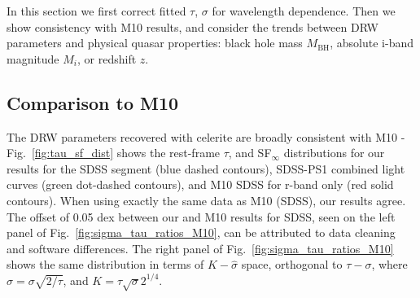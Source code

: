 \documentclass[twocolumn]{aastex62}
\newcommand{\project}[1]{\textsf{#1}}
\begin{document}
In this section we first correct fitted $\tau$, $\sigma$ for wavelength dependence. Then we show consistency with M10 results,  and consider the trends between DRW parameters and physical quasar properties: black hole mass $M_{\mathrm{BH}}$, absolute i-band  magnitude $M_{i}$, or redshift $z$.  


\subsection{Comparison to M10}
The DRW parameters recovered with \project{celerite} are  broadly consistent with M10 - Fig.~\ref{fig:tau_sf_dist} shows the rest-frame  $\tau$, and SF$_{\infty}$ distributions for our results for the SDSS segment (blue dashed contours),  SDSS-PS1 combined light curves (green dot-dashed contours), and  M10 SDSS for r-band only (red solid contours). When using exactly the same data as M10 (SDSS), our results agree. The offset of 0.05 dex  between our and M10 results for SDSS, seen on the left panel of Fig.~\ref{fig:sigma_tau_ratios_M10}, can be attributed to data cleaning and software differences. The right panel of Fig.~\ref{fig:sigma_tau_ratios_M10} shows the same distribution in terms of $K-\hat{\sigma}$ space, orthogonal to $\tau-\sigma$, where $\hat{\sigma} = \sigma\sqrt{2 / \tau}$, and $K = \tau \sqrt{\sigma} 2^{1/4} $. 


\begin{figure*} %
\caption{Comparison of \project{celerite} fits using only the  SDSS r-band segments of S82 quasars ($\sigma_{\mathrm{SDSS}}, \tau_{\mathrm{SDSS}}$), against M10 results for SDSS r-band ($\sigma_{M10}, \tau_{M10}$), object-by-object. The small offset ($<0.05 $ dex) can be attributed to software differences. See Fig.~\ref{fig:tau_sf_dist} for a comparison of rest-frame $\tau$ and SF$_{\infty}$ distributions. This is similar to Fig.3 in M10, except we plot only the r-band SDSS results. The right-hand panel shows the comparison in an orthogonal $K-\hat{\sigma}$  space, where $K$ is the direction along the diagonal on the left panel, and $\hat{\sigma}$-perpendicular to the diagonal. For this reason the right panel has a ten times smaller scatter along $\hat{\sigma}$ (0.037) than $K$ (0.358).} 
\label{fig:sigma_tau_ratios_M10}
\end{figure*} 
\end{document}
